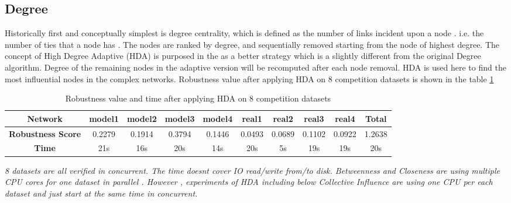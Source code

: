 \documentclass{article}
\begin{document}
	\subsection{Degree}		

	Historically first and conceptually simplest is degree centrality, which is defined as the number of links incident upon a node . i.e. the number of ties that a node has \cite{wikiCentrality}. The nodes are ranked by degree, and sequentially removed starting from the node of highest degree. The concept of High Degree Adaptive (HDA) is purposed in the \cite{morone2015influence} as a better strategy which is a slightly different from the original Degree algorithm. Degree of the remaining nodes in the adaptive version will be recomputed after each node removal. HDA is used here to find the most influential nodes in the complex networks. Robustness value after applying HDA on 8 competition datasets is shown in the table \ref{tab:table5}
	

		
	\begin{table}[!htbp]
		\begin{adjustwidth}{-1.3cm}{}		
			\begin{threeparttable}
				\centering
				\caption{Robustness value and time after applying HDA on 8 competition datasets}
				\label{tab:table5}
				
				\begin{tabular}{|c|c|c|c|c|c|c|c|c|c|}
					\hline
					\textbf{Network}          & \textbf{model1} & \textbf{model2} & \textbf{model3} & \textbf{model4} & \textbf{real1} & \textbf{real2} & \textbf{real3} & \textbf{real4} & \textbf{Total} \\ \hline
					\textbf{Robustness Score} & 0.2279          & 0.1914          & 0.3794          & 0.1446          & 0.0493         & 0.0689         & 0.1102         & 0.0922         & 1.2638         \\ \hline
					\textbf{Time}     & 21s             & 16s             & 20s             & 14s             & 20s            & 5s             & 19s            & 19s            & 20s            \\ \hline					
				\end{tabular}
				\begin{tablenotes}
					\small
					\item\textit{8 datasets are all verified in concurrent. The time doesn\textquotesingle t cover IO read/write from/to disk. Betweenness and Closeness are using multiple CPU cores for one dataset in parallel . However , experiments of HDA including below Collective Influence are using one CPU per each dataset and just start at the same time in concurrent.}
				\end{tablenotes}			
			\end{threeparttable}
		\end{adjustwidth}
	\end{table}
	
\end{document}
